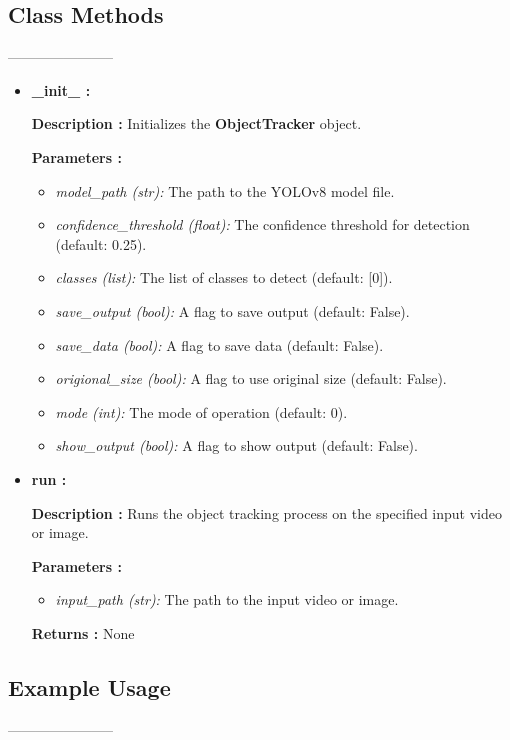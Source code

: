 \documentclass{article}
\begin{document}
\subsection{Class Methods}
-----------------------

\begin{itemize}
    \item\textbf{\_init\_ :} 
    
    \textbf{Description :} Initializes the \textbf{ObjectTracker} object.

    \textbf{Parameters :}    
    \begin{itemize}
        \item \textit{model\_path (str):} The path to the YOLOv8 model file.
        \item \textit{confidence\_threshold (float):} The confidence threshold for detection (default: 0.25).
        \item \textit{classes (list):} The list of classes to detect (default: [0]).
        \item \textit{save\_output (bool):} A flag to save output (default: False).
        \item \textit{save\_data (bool):} A flag to save data (default: False).
        \item \textit{origional\_size (bool):} A flag to use original size (default: False).
        \item \textit{mode (int):} The mode of operation (default: 0).
        \item \textit{show\_output (bool):} A flag to show output (default: False).
    \end{itemize}
    
    \item\textbf{run :}
    
    \textbf{Description :} Runs the object tracking process on the specified input video or image.

    \textbf{Parameters :}
    \begin{itemize}
        \item \textit{input\_path (str):} The path to the input video or image.
    \end{itemize}

    \textbf{Returns :} None
    
\end{itemize}

\subsection{Example Usage}
-----------------------
\end{document}
